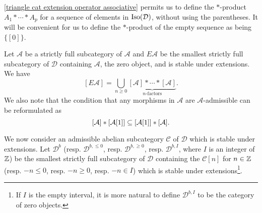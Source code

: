 \cref{triangle cat extension operator associative} permits us to define the $\ast$-product $A_1\ast\cdots\ast A_p$ for a sequence of elements in $\mathrm{Iso}(\mathcal{D})$, without using the parentheses. It will be convenient for us to define the $\ast$-product of the empty sequence as being $\{[0]\}$.

\begin{example}\label{triangle cat extension closure of subcategory}
Let $\mathcal{A}$ be a strictly full subcategory of $\mathcal{A}$ and $E\mathcal{A}$ be the smallest strictly full subcategory of $\mathcal{D}$ containing $\mathcal{A}$, the zero object, and is stable under extensions. We have
\begin{equation}\label{triangle cat extension closure of subcategory-1}
[E\mathcal{A}]=\bigcup_{n\geq 0}\underbrace{[\mathcal{A}]\ast\cdots\ast[\mathcal{A}]}_{\text{$n$-factors}}.
\end{equation}
We also note that the condition that any morphisms in $\mathcal{A}$ are $\mathcal{A}$-admissible can be reformulated as
\begin{equation}\label{triangle cat extension closure of subcategory-2}
[\mathcal{A}]\ast[\mathcal{A}[1]]\subseteq[\mathcal{A}[1]]\ast[\mathcal{A}].
\end{equation}
\end{example}

We now consider an admissible abelian subcategory $\mathcal{C}$ of $\mathcal{D}$ which is stable under extensions. Let $\mathcal{D}^b$ (resp. $\mathcal{D}^{b,\leq 0}$, resp. $\mathcal{D}^{b,\geq 0}$, resp. $\mathcal{D}^{b,I}$, where $I$ is an integer of $\mathbb{Z}$) be the smallest strictly full subcategory of $\mathcal{D}$ containing the $\mathcal{C}[n]$ for $n\in\mathbb{Z}$ (resp. $-n\leq 0$, resp. $-n\geq 0$, resp. $-n\in I$) which is stable under extensions\footnote{If $I$ is the empty interval, it is more natural to define $\mathcal{D}^{b,I}$ to be the category of zero objects.}.


